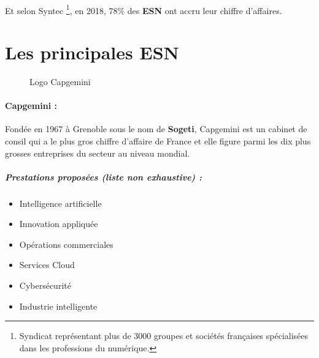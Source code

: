 \documentclass{article}
\begin{document}
\paragraph{}
Et selon Syntec \footnote{Syndicat représentant plus de 3000 groupes et sociétés françaises spécialisées dans les professions du numérique.}, en 2018, 78\% des \textbf{ESN} ont accru leur chiffre d'affaires.

\section{Les principales \textbf{ESN}}

\begin{figure}[H]
  \caption{Logo Capgemini}
\end{figure}

\paragraph{Capgemini :}

Fondée en 1967 à Grenoble sous le nom de \textbf{Sogeti}, Capgemini est un cabinet de consil qui a le plus gros chiffre d'affaire de France et elle figure parmi les dix plus grosses entreprises du secteur au niveau mondial.

  \subparagraph{Prestations proposées (liste non exhaustive) :}

  \begin{itemize}
    \item Intelligence artificielle
    \item Innovation appliquée
    \item Opérations commerciales
    \item Services Cloud
    \item Cybersécurité
    \item Industrie intelligente
  \end{itemize}
\end{document}
